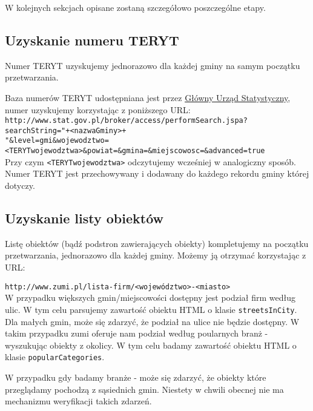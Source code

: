 \documentclass[a4 122pt]{article}
\begin{document}
			W kolejnych sekcjach opisane zostaną szczegółowo poszczególne etapy.
		
		\subsection{Uzyskanie numeru TERYT}
		
			Numer TERYT uzyskujemy jednorazowo dla każdej gminy na samym początku przetwarzania.
			
			Baza numerów TERYT udostępniana jest przez \href{http://www.stat.gov.pl}{Główny Urząd Statystyczny}, numer uzyskujemy korzystając z poniższego URL:\\
			
			\noindent \texttt{http://www.stat.gov.pl/broker/access/performSearch.jspa?searchString="+<nazwaGminy>+}\\
			\noindent \texttt{"\&level=gmi\&wojewodztwo=<TERYTwojewodztwa>\&powiat=\&gmina=\&miejscowosc=\&advanced=true}\\
			
			\noindent Przy czym \texttt{<TERYTwojewodztwa>} odczytujemy wcześniej w analogiczny sposób.
			Numer TERYT jest przechowywany i dodawany do każdego rekordu gminy której dotyczy.
			
		\subsection{Uzyskanie listy obiektów}
		
			Listę obiektów (bądź podstron zawierających obiekty) kompletujemy na początku przetwarzania, jednorazowo dla każdej gminy.
			Możemy ją otrzymać korzystając z URL:
			
			\noindent \texttt{http://www.zumi.pl/lista-firm/<województwo>-<miasto>}\\
		
			\noindent W przypadku większych gmin/miejscowości dostępny jest podział firm według ulic. W tym celu parsujemy zawartość obiektu HTML o klasie \texttt{streetsInCity}.\\
			
			\noindent Dla małych gmin, może się zdarzyć, że podział na ulice nie będzie dostępny.
			W takim przypadku zumi oferuje nam podział według poularnych branż - wyszukując obiekty z okolicy.
			W tym celu badamy zawartość obiektu HTML o klasie \texttt{popularCategories}.
			
			\noindent W przypadku gdy badamy branże - może się zdarzyć, że obiekty które przeglądamy pochodzą z sąsiednich gmin.
			Niestety w chwili obecnej nie ma mechanizmu weryfikacji takich zdarzeń.
			
\end{document}
